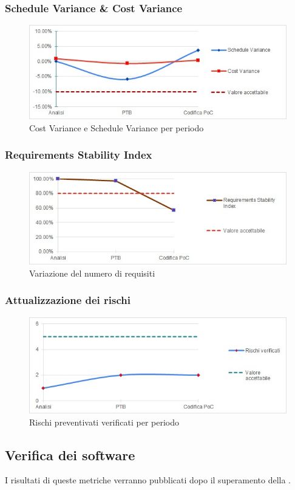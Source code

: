 \subsubsection{Schedule Variance \& Cost Variance}
\begin{figure}[H]
  \centering
  \includegraphics[scale=0.8]{immagini/sv_cv.jpg}
  \caption{Cost Variance e Schedule Variance per periodo}
\end{figure}

\subsubsection{Requirements Stability Index}
\begin{figure}[H]
  \centering
  \includegraphics[scale=0.8]{immagini/rsi.jpg}
  \caption{Variazione del numero di requisiti}
\end{figure}

\subsubsection{Attualizzazione dei rischi}
\begin{figure}[H]
  \centering
  \includegraphics[scale=0.8]{immagini/rischi.jpg}
  \caption{Rischi preventivati verificati per periodo}
\end{figure}


\subsection{Verifica dei software}\label{subsection:verifica_software}
I risultati di queste metriche verranno pubblicati dopo il superamento della \RTB{}.